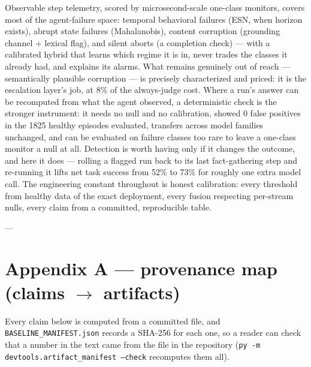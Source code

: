 \documentclass[11pt]{article}
\begin{document}
Observable step telemetry, scored by microsecond-scale one-class monitors, covers most of the agent-failure space: temporal behavioral failures (ESN, when horizon exists), abrupt state failures (Mahalanobis), content corruption (grounding channel + lexical flag), and silent aborts (a completion check) --- with a calibrated hybrid that learns which regime it is in, never trades the classes it already had, and explains its alarms. What remains genuinely out of reach --- semantically plausible corruption --- is precisely characterized and priced: it is the escalation layer's job, at 8\% of the always-judge cost. Where a run's answer can be recomputed from what the agent observed, a deterministic check is the stronger instrument: it needs no null and no calibration, showed 0 false positives in the 1825 healthy episodes evaluated, transfers across model families unchanged, and can be evaluated on failure classes too rare to leave a one-class monitor a null at all. Detection is worth having only if it changes the outcome, and here it does --- rolling a flagged run back to its last fact-gathering step and re-running it lifts net task success from 52\% to 73\% for roughly one extra model call. The engineering constant throughout is honest calibration: every threshold from healthy data of the exact deployment, every fusion respecting per-stream nulls, every claim from a committed, reproducible table.


---


\section{Appendix A --- provenance map (claims $\rightarrow$ artifacts)}


Every claim below is computed from a committed file, and \texttt{BASELINE\_\allowbreak{}MANIFEST.json} records a SHA-256 for each one, so a reader can check that a number in the text came from the file in the repository (\texttt{py -m devtools.artifact\_\allowbreak{}manifest --check} recomputes them all).
\end{document}
